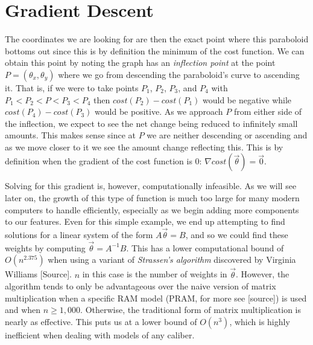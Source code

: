 \section{Gradient Descent}
\label{st:gradient descent}



The coordinates we are looking for are then the exact point where this
paraboloid bottoms out since this is by definition the minimum of the cost
function. We can obtain this point by noting the graph has an \emph{inflection
point} at the point $P = (\theta_x, \theta_y)$ where we go from descending the
paraboloid's curve to ascending it. That is, if we were to take points $P_1$,
$P_2$, $P_3$, and $P_4$ with $P_1 < P_2 < P < P_3 < P_4$ then $cost(P_2) -
cost(P_1)$ would be negative while $cost(P_4) - cost(P_3)$ would be positive. As
we approach $P$ from either side of the inflection, we expect to see the net
change being reduced to infinitely small amounts. This makes sense since at $P$
we are neither descending or ascending and as we move closer to it we see the
amount change reflecting this. This is by definition when the gradient of the
cost function is 0: $\nabla cost(\vec\theta) = \vec{0}$.

Solving for this gradient is, however, computationally infeasible. As we will
see later on, the growth of this type of function is much too large for many
modern computers to handle efficiently, especially as we begin adding more
components to our features. Even for this simple example, we end up attempting
to find solutions for a linear system of the form $A\vec\theta = B$, and so we
could find these weights by computing $\vec\theta =A^{-1}B$. This has a lower
computational bound of $O(n^{2.375})$ when using a variant of \emph{Strassen's
algorithm} discovered by Virginia Williams [Source]. $n$ in this case is the
number of weights in $\vec\theta$. However, the algorithm tends to only be
advantageous over the naive version of matrix multiplication when a specific RAM
model (PRAM, for more see [source]) is used and when $n \geq 1,000$. Otherwise,
the traditional form of matrix multiplication is nearly as effective. This puts
us at a lower bound of $O(n^3)$, which is highly inefficient when dealing with
models of any caliber.
